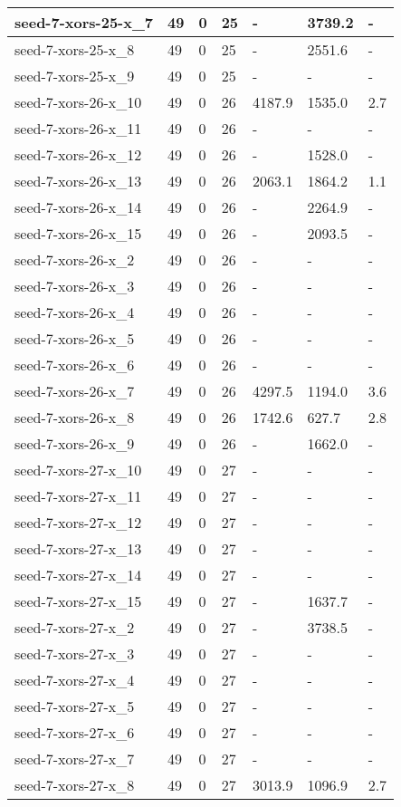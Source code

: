 \begin{scriptsize}
\begin{longtable}{|p{5cm}|l|l|l|l|l|l|}
seed-7-xors-25-x\_7&49&0&25&-&3739.2&- \\ \hline 
seed-7-xors-25-x\_8&49&0&25&-&2551.6&- \\ \hline 
seed-7-xors-25-x\_9&49&0&25&-&-&- \\ \hline 
seed-7-xors-26-x\_10&49&0&26&4187.9&1535.0&2.7 \\ \hline 
seed-7-xors-26-x\_11&49&0&26&-&-&- \\ \hline 
seed-7-xors-26-x\_12&49&0&26&-&1528.0&- \\ \hline 
seed-7-xors-26-x\_13&49&0&26&2063.1&1864.2&1.1 \\ \hline 
seed-7-xors-26-x\_14&49&0&26&-&2264.9&- \\ \hline 
seed-7-xors-26-x\_15&49&0&26&-&2093.5&- \\ \hline 
seed-7-xors-26-x\_2&49&0&26&-&-&- \\ \hline 
seed-7-xors-26-x\_3&49&0&26&-&-&- \\ \hline 
seed-7-xors-26-x\_4&49&0&26&-&-&- \\ \hline 
seed-7-xors-26-x\_5&49&0&26&-&-&- \\ \hline 
seed-7-xors-26-x\_6&49&0&26&-&-&- \\ \hline 
seed-7-xors-26-x\_7&49&0&26&4297.5&1194.0&3.6 \\ \hline 
seed-7-xors-26-x\_8&49&0&26&1742.6&627.7&2.8 \\ \hline 
seed-7-xors-26-x\_9&49&0&26&-&1662.0&- \\ \hline 
seed-7-xors-27-x\_10&49&0&27&-&-&- \\ \hline 
seed-7-xors-27-x\_11&49&0&27&-&-&- \\ \hline 
seed-7-xors-27-x\_12&49&0&27&-&-&- \\ \hline 
seed-7-xors-27-x\_13&49&0&27&-&-&- \\ \hline 
seed-7-xors-27-x\_14&49&0&27&-&-&- \\ \hline 
seed-7-xors-27-x\_15&49&0&27&-&1637.7&- \\ \hline 
seed-7-xors-27-x\_2&49&0&27&-&3738.5&- \\ \hline 
seed-7-xors-27-x\_3&49&0&27&-&-&- \\ \hline 
seed-7-xors-27-x\_4&49&0&27&-&-&- \\ \hline 
seed-7-xors-27-x\_5&49&0&27&-&-&- \\ \hline 
seed-7-xors-27-x\_6&49&0&27&-&-&- \\ \hline 
seed-7-xors-27-x\_7&49&0&27&-&-&- \\ \hline 
seed-7-xors-27-x\_8&49&0&27&3013.9&1096.9&2.7 \\ \hline 

\end{longtable}
\end{scriptsize}
